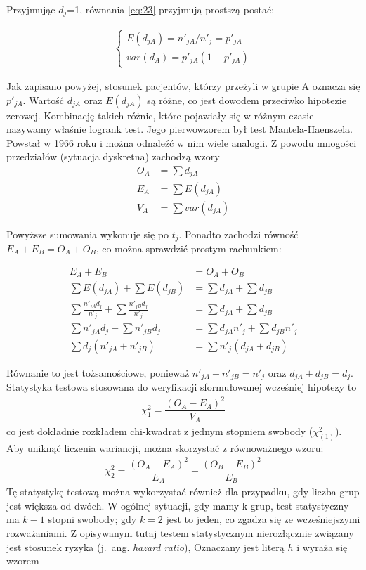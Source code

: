 \documentclass[licencjacka]{pwr_wmat_praca_dyplomowa}
\theoremstyle{plain}
\numberwithin{theorem}{chapter}
\theoremstyle{definition}
\numberwithin{theorem}{chapter}
\begin{document}
Przyjmując $d_j$=1, równania \ref{eq:23} przyjmują prostszą postać:

\begin{align*}
\left\{\begin{array}{ll} E(d_{jA})=n'_{jA}/n'_j=p'_{jA}\\ var(d_{A})=p'_{jA}(1-p'_{jA})  \end{array} \right.
\end{align*}

Jak zapisano powyżej, stosunek pacjentów, którzy przeżyli w grupie A oznacza się $p'_{jA}$. Wartość $d_{jA}$ oraz $E(d_{jA})$ są różne, co jest dowodem przeciwko hipotezie zerowej. Kombinację takich różnic, które pojawiały się w różnym czasie nazywamy właśnie logrank test. Jego pierwowzorem był test Mantela-Haenszela. Powstał w 1966 roku i można odnaleźć w nim wiele analogii. Z powodu mnogości przedziałów (sytuacja dyskretna) zachodzą wzory \cite{smimr}
\begin{align}
O_A&=\sum d_{jA} \nonumber \\
E_A&=\sum E(d_{jA}) \\
V_A&=\sum var(d_{jA}) \nonumber
\end{align}



Powyższe sumowania wykonuje się po $t_j$. Ponadto zachodzi równość $E_A+E_B=O_A+O_B$, co można sprawdzić prostym rachunkiem:

\begin{align*}
E_A+E_B&=O_A+O_B \\ 
\sum E(d_{jA})+\sum E(d_{jB})&=\sum d_{jA}+\sum d_{jB}  \\
\sum\frac{n'_{jA}d_j}{n'_j}+\sum\frac{n'_{jB}d_j}{n'_j}&=\sum d_{jA}+\sum d_{jB} \\
\sum n'_{jA}d_j+\sum n'_{jB}d_j&=\sum d_{jA}n'_j+\sum d_{jB}n'_j \\
\sum d_j(n'_{jA}+n'_{jB})&=\sum n'_j(d_{jA}+d_{jB})
\end{align*}

Równanie to jest tożsamościowe, ponieważ $n'_{jA}+n'_{jB}=n'_j$ oraz $d_{jA}+d_{jB}=d_j$.
Statystyka testowa stosowana do weryfikacji sformułowanej wcześniej hipotezy to \cite{smimr}
\begin{align}
\chi^2_1=\dfrac{(O_A-E_A)^2}{V_A}
\end{align}
co jest dokładnie rozkładem chi-kwadrat z jednym stopniem swobody ($\chi^2_{(1)}$). Aby uniknąć liczenia wariancji, można skorzystać z równoważnego wzoru:
\begin{align}
\chi^2_2=\dfrac{(O_A-E_A)^2}{E_A}+\dfrac{(O_B-E_B)^2}{E_B}
\end{align}
Tę statystykę testową można wykorzystać również dla przypadku, gdy liczba grup jest większa od dwóch. W ogólnej sytuacji, gdy mamy k grup, test statystyczny ma $k-1$ stopni swobody; gdy $k=2$ jest to jeden, co zgadza się ze wcześniejszymi rozważaniami. \newline
Z opisywanym tutaj testem statystycznym nierozłącznie związany jest stosunek ryzyka (j.~ang. \textit{hazard ratio}), Oznaczany jest literą $h$ i wyraża się wzorem \cite{smimr}
\end{document}

